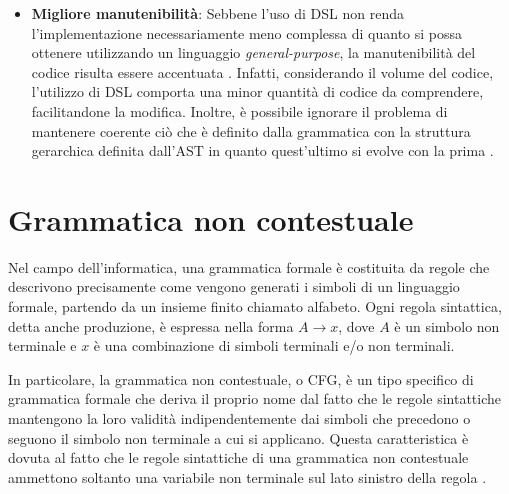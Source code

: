 \documentclass[12pt,a4paper,openright,twoside]{book}
\begin{document}
\begin{itemize}
    qualità del codice generato è chiaramente migliore [...] perché il linguaggio di modellazione è stato progettato per adattarsi 
    all'architettura del nostro terminale''\footnote{Di seguito riportata l'affermazione citata, in lingua originale:``the quality of the 
    generated code is clearly better, simply because the modelling language was designed to fit our terminal architecture''}. Inoltre, 
    l'offuscamento della reale complessità del problema, dovuto all'utilizzo di \ac{DSL}, consente ai nuovi sviluppatori di lavorare ad un 
    alto livello d'astrazione, senza dover conoscere tutti i dettagli inerenti all'implementazione del linguaggio \cite{EADS}. 
    \item \textbf{Migliore manutenibilità}: Sebbene l'uso di \ac{DSL} non renda l'implementazione necessariamente meno complessa di quanto 
    si possa ottenere utilizzando un linguaggio \textit{general-purpose}, la manutenibilità del codice risulta essere accentuata 
    \cite{Klint2010}.  Infatti, considerando il volume del codice, l'utilizzo di \ac{DSL} comporta una minor quantità di codice da comprendere, 
    facilitandone la modifica. Inoltre, è possibile  ignorare il problema di mantenere coerente ciò che è definito dalla grammatica con la 
    struttura gerarchica definita dall'\ac{AST} in quanto quest'ultimo si evolve con la prima \cite{Brabrand2010}.
\end{itemize}

\section{Grammatica non contestuale}
Nel campo dell’informatica, una grammatica formale è costituita da regole che descrivono precisamente come vengono generati i simboli di un 
linguaggio formale, partendo da un insieme finito chiamato alfabeto. Ogni regola sintattica, detta anche produzione, è espressa nella forma 
$A \rightarrow x$, dove $A$ è un simbolo non terminale e $x$ è una combinazione di simboli terminali e/o non terminali.

In particolare, la grammatica non contestuale, o \ac{CFG}, è un tipo specifico di grammatica formale che deriva il proprio nome dal fatto che 
le regole sintattiche mantengono la loro validità indipendentemente dai simboli che precedono o seguono il simbolo non terminale a cui si 
applicano. Questa caratteristica è dovuta al fatto che le regole sintattiche di una grammatica non contestuale ammettono soltanto una variabile 
non terminale sul lato sinistro della regola \cite{Linz2022}.
\end{document}
